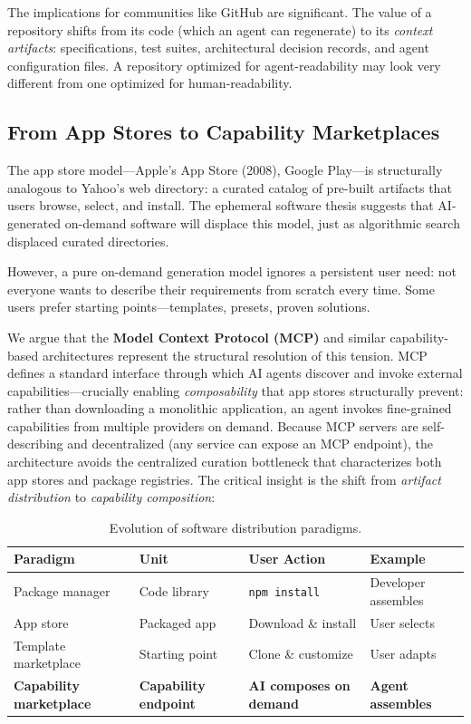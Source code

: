 \documentclass[sigconf, nonacm, anonymous=false]{acmart}
\begin{document}
The implications for communities like GitHub are significant. The value of a repository shifts from its code (which an agent can regenerate) to its \textit{context artifacts}: specifications, test suites, architectural decision records, and agent configuration files. A repository optimized for agent-readability may look very different from one optimized for human-readability.

\subsection{From App Stores to Capability Marketplaces}

The app store model---Apple's App Store (2008), Google Play---is structurally analogous to Yahoo's web directory: a curated catalog of pre-built artifacts that users browse, select, and install. The ephemeral software thesis \citep{ellis2025ephemeral, houston2025ephemeral, ali2025ephemeral, harel2025disposable, playbooks2025jit} suggests that AI-generated on-demand software will displace this model, just as algorithmic search displaced curated directories.

However, a pure on-demand generation model ignores a persistent user need: not everyone wants to describe their requirements from scratch every time. Some users prefer starting points---templates, presets, proven solutions.

We argue that the \textbf{Model Context Protocol (MCP)} \citep{mcp2024} and similar capability-based architectures represent the structural resolution of this tension. MCP defines a standard interface through which AI agents discover and invoke external capabilities---crucially enabling \textit{composability} that app stores structurally prevent: rather than downloading a monolithic application, an agent invokes fine-grained capabilities from multiple providers on demand. Because MCP servers are self-describing and decentralized (any service can expose an MCP endpoint), the architecture avoids the centralized curation bottleneck that characterizes both app stores and package registries. The critical insight is the shift from \textit{artifact distribution} to \textit{capability composition}:

\begin{table}[h]
\centering
\small
\begin{tabularx}{\textwidth}{lXXX}
\toprule
\textbf{Paradigm} & \textbf{Unit} & \textbf{User Action} & \textbf{Example} \\
\midrule
Package manager & Code library & \texttt{npm install} & Developer assembles \\
App store & Packaged app & Download \& install & User selects \\
Template marketplace & Starting point & Clone \& customize & User adapts \\
\textbf{Capability marketplace} & \textbf{Capability endpoint} & \textbf{AI composes on demand} & \textbf{Agent assembles} \\
\bottomrule
\end{tabularx}
\caption{Evolution of software distribution paradigms.}
\label{tab:distribution}
\end{table}
\end{document}

